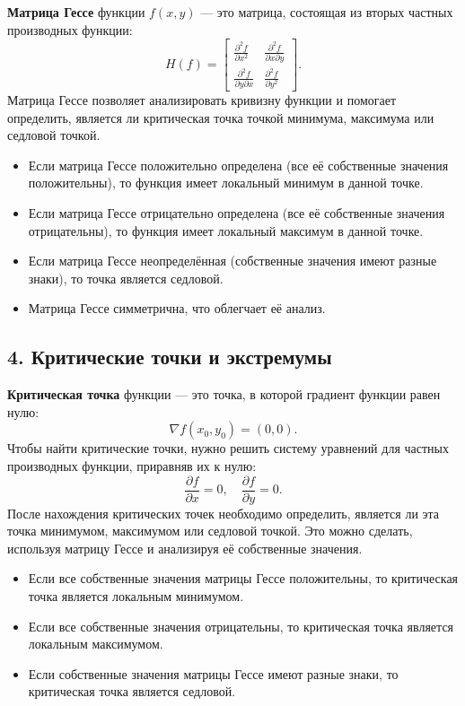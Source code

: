 \documentclass[a4paper,12pt]{article}
\begin{document}
\textbf{Матрица Гессе} функции \( f(x, y) \) — это матрица, состоящая из вторых частных производных функции:
\[
H(f) =
\begin{bmatrix}
\frac{\partial^2 f}{\partial x^2} & \frac{\partial^2 f}{\partial x \partial y} \\
\frac{\partial^2 f}{\partial y \partial x} & \frac{\partial^2 f}{\partial y^2}
\end{bmatrix}.
\]
Матрица Гессе позволяет анализировать кривизну функции и помогает определить, является ли критическая точка точкой минимума, максимума или седловой точкой.

\begin{itemize}
    \item Если матрица Гессе положительно определена (все её собственные значения положительны), то функция имеет локальный минимум в данной точке.
    \item Если матрица Гессе отрицательно определена (все её собственные значения отрицательны), то функция имеет локальный максимум в данной точке.
    \item Если матрица Гессе неопределённая (собственные значения имеют разные знаки), то точка является седловой.
    \item Матрица Гессе симметрична, что облегчает её анализ.
\end{itemize}

\subsection*{4. Критические точки и экстремумы}

\textbf{Критическая точка} функции — это точка, в которой градиент функции равен нулю:
\[
\nabla f(x_0, y_0) = (0, 0).
\]
Чтобы найти критические точки, нужно решить систему уравнений для частных производных функции, приравняв их к нулю:
\[
\frac{\partial f}{\partial x} = 0, \quad \frac{\partial f}{\partial y} = 0.
\]
После нахождения критических точек необходимо определить, является ли эта точка минимумом, максимумом или седловой точкой. Это можно сделать, используя матрицу Гессе и анализируя её собственные значения.

\begin{itemize}
    \item Если все собственные значения матрицы Гессе положительны, то критическая точка является локальным минимумом.
    \item Если все собственные значения отрицательны, то критическая точка является локальным максимумом.
    \item Если собственные значения матрицы Гессе имеют разные знаки, то критическая точка является седловой.
\end{itemize}
\end{document}
